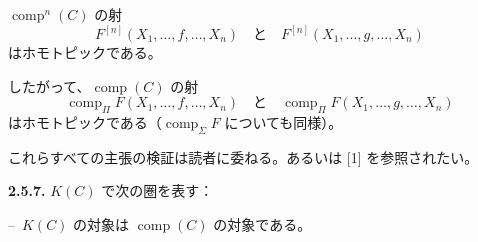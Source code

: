 $\operatorname{comp}^{n}(C)$ の射
\begin{equation*}
  F^{[n]}(X_1,\ldots,f,\ldots,X_n)
  \quad\text{と}\quad
  F^{[n]}(X_1,\ldots,g,\ldots,X_n)
\end{equation*}
はホモトピックである。

したがって、$\operatorname{comp}(C)$ の射
\begin{equation*}
  \operatorname{comp}_{\Pi}F(X_1,\ldots,f,\ldots,X_n)
  \quad\text{と}\quad
  \operatorname{comp}_{\Pi}F(X_1,\ldots,g,\ldots,X_n)
\end{equation*}
はホモトピックである（$\operatorname{comp}_{\Sigma}F$ についても同様）。

これらすべての主張の検証は読者に委ねる。あるいは [1] を参照されたい。

\noindent\textbf{2.5.7.}\quad
$K(C)$ で次の圏を表す：

\noindent\hspace*{2em}--\ $K(C)$ の対象は $\operatorname{comp}(C)$ の対象である。

